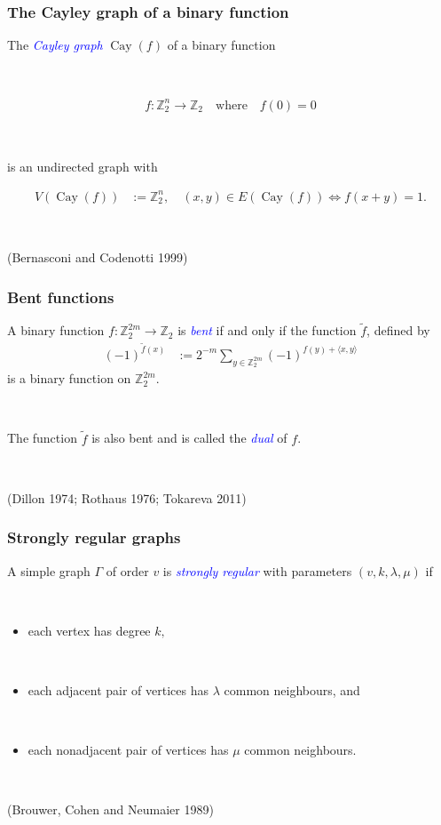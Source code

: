 \documentclass[pdf,sprung,slideColor,nocolorBG]{beamer}
\newcommand{\slidecite}[1]{\tiny{(#1)}\normalsize{}}
\newcommand{\mb}[1]{\mathbb{#1}}
\newcommand{\Emph}[1]{\emph{\textcolor{blue}{#1}}}
\newcommand{\To}{\rightarrow}
\newcommand{\Cay}[1]{\operatorname{Cay}\left(#1\right)}
\newcommand{\dual}[1]{\widetilde{#1}}
\newcommand{\Z}{\mb{Z}}
\begin{document}
\begin{frame}
\frametitle{The Cayley graph of a binary function}
The \Emph{Cayley graph} $\Cay{f}$ of a binary function 

~

\begin{align*}
%
f : \Z_2^n \To \Z_2 \quad \text{where} \quad f(0) = 0 
% 
\end{align*}

~

is 
an undirected graph with 

\begin{align*}
V(\Cay{f}) &:= \Z_2^n, \quad (x,y) \in E(\Cay{f}) \Leftrightarrow f(x+y) = 1.
\end{align*}

~

\slidecite{Bernasconi and Codenotti 1999}
\end{frame}
\begin{frame}
\frametitle{Bent functions}

A binary function  $f : \Z_2^{2m} \To \Z_2$ is \Emph{bent} if and only if the function $\dual{f}$, defined by
\begin{align*}
(-1)^{\dual{f}(x)} &:= 2^{-m} \sum_{y \in \Z_2^{2m}} (-1)^{f(y) + \langle x, y \rangle}
\end{align*}
is a binary function on $\Z_2^{2m}$.

~

The function $\dual{f}$ is also bent and is called the \Emph{dual} of $f$.

~

\slidecite{Dillon 1974; Rothaus 1976; Tokareva 2011}
\end{frame}

\begin{frame}
\frametitle{Strongly regular graphs}
A simple graph $\Gamma$ of order $v$ is \Emph{strongly regular} with parameters 
$(v,k,\lambda,\mu)$ if 

~

\begin{itemize}
 \item 
each vertex has degree $k,$ 

~
 \item 
each adjacent pair of vertices has $\lambda$ common neighbours, and

~
\item
each nonadjacent pair of vertices has $\mu$ common neighbours.
\end{itemize}

~

\slidecite{Brouwer, Cohen and Neumaier 1989}

\end{frame}
\end{document}
